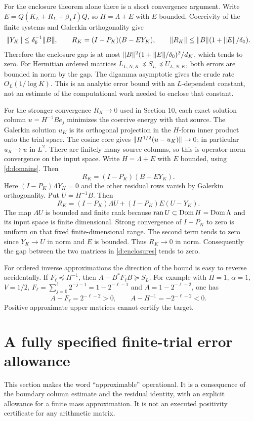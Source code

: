 For the enclosure theorem alone there is a short convergence argument.
Write $E=Q(K_L+R_L+\beta_LI)Q$, so $H=\Lambda+E$ with $E$ bounded.
Coercivity of the finite systems and Galerkin orthogonality give
\[
\lVert Y_K\rVert\le\delta_0^{-1}\lVert B\rVert,\qquad
R_K=(I-P_K)(B-EY_K),\qquad
\lVert R_K\rVert\le\lVert B\rVert(1+\lVert E\rVert/\delta_0).
\]
Therefore the enclosure gap is at most
$\lVert B\rVert^2(1+\lVert E\rVert/\delta_0)^2/d_K$, which tends to zero.
For Hermitian ordered matrices $L_{L,N,K}\preceq S_L\preceq U_{L,N,K}$,
both errors are bounded in norm by the gap.
The digamma asymptotic gives the crude rate $O_L(1/\log K)$.
This is an analytic error bound with an $L$-dependent constant, not an
estimate of the computational work needed to enclose that constant.

For the stronger convergence $R_K\to0$ used in Section 10, each exact solution column $u=H^{-1}Be_j$ minimizes
the coercive energy with that source. The Galerkin solution $u_K$ is its
orthogonal projection in the $H$-form inner product onto the trial space.
The cosine core gives $\lVert H^{1/2}(u-u_K)\rVert\to0$; in particular
$u_K\to u$ in $L^2$. There are finitely many source columns, so this is
operator-norm convergence on the input space.
Write $H=\Lambda+E$ with $E$ bounded, using \eqref{d:domains}. Then
\[
R_K=(I-P_K)(B-EY_K).
\]
Here $(I-P_K)\Lambda Y_K=0$ and the other residual rows vanish by
Galerkin orthogonality. Put $U=H^{-1}B$. Then
\[
R_K=(I-P_K)\Lambda U+(I-P_K)E(U-Y_K).
\]
The map $\Lambda U$ is bounded and finite rank because
$\operatorname{ran}U\subset\operatorname{Dom} H=\operatorname{Dom}\Lambda$ and its input space is
finite dimensional. Strong convergence of $I-P_K$ to zero is uniform on
that fixed finite-dimensional range. The second term tends to zero since
$Y_K\to U$ in norm and $E$ is bounded. Thus $R_K\to0$ in norm.
Consequently the gap
between the two matrices in \eqref{d:enclosures} tends to zero.

For ordered inverse approximations the direction of the bound is easy
to reverse accidentally. If $F_\ell\preceq H^{-1}$, then
$A-B^*F_\ell B\succeq S_L$.
For example with $H=1$, $\alpha=1$, $V=1/2$,
$F_\ell=\sum_{j=0}^\ell 2^{-j-1}=1-2^{-\ell-1}$ and
$A=1-2^{-\ell-2}$, one has
\[
A-F_\ell=2^{-\ell-2}>0,\qquad A-H^{-1}=-2^{-\ell-2}<0.
\]
Positive approximate upper matrices cannot certify the target.

\section{A fully specified finite-trial error allowance}
This section makes the word ``approximable'' operational. It is a
consequence of the boundary column estimate and the residual identity,
with an explicit allowance for a finite mass approximation. It is not
an executed positivity certificate for any arithmetic matrix.

